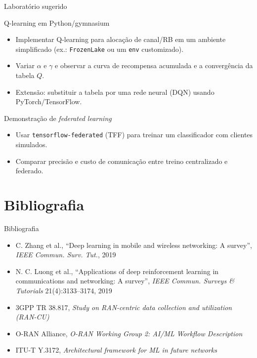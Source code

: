 \documentclass[aspectratio=169,11pt]{beamer}
\begin{document}
\begin{frame}{Laboratório sugerido}
  \begin{block}{Q-learning em Python/gymnasium}
    \begin{itemize}
      \item Implementar Q-learning para alocação de canal/RB em um ambiente simplificado (ex.: \texttt{FrozenLake} ou um \texttt{env} customizado).
      \item Variar $\alpha$ e $\gamma$ e observar a curva de recompensa acumulada e a convergência da tabela $Q$.
      \item Extensão: substituir a tabela por uma rede neural (DQN) usando PyTorch/TensorFlow.
    \end{itemize}
  \end{block}
  \begin{block}{Demonstração de \emph{federated learning}}
    \begin{itemize}
      \item Usar \texttt{tensorflow-federated} (TFF) para treinar um classificador com clientes simulados.
      \item Comparar precisão e custo de comunicação entre treino centralizado e federado.
    \end{itemize}
  \end{block}
\end{frame}

\section{Bibliografia}

\begin{frame}{Bibliografia}
  \begin{itemize}
    \item C. Zhang et al., ``Deep learning in mobile and wireless networking: A survey'', \emph{IEEE Commun. Surv. Tut.}, 2019
    \item N. C. Luong et al., ``Applications of deep reinforcement learning in communications and networking: A survey'', \emph{IEEE Commun. Surveys \& Tutorials} 21(4):3133--3174, 2019
    \item 3GPP TR 38.817, \emph{Study on RAN-centric data collection and utilization (RAN-CU)}
    \item O-RAN Alliance, \emph{O-RAN Working Group 2: AI/ML Workflow Description}
    \item ITU-T Y.3172, \emph{Architectural framework for ML in future networks}
  \end{itemize}
\end{frame}
\end{document}
